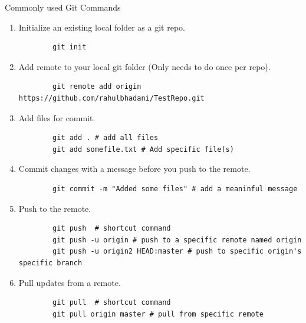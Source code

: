 \documentclass[aspectratio=169,xcolor=dvipsnames,svgnames,x11names,fleqn]{beamer}
\begin{document}
\begin{frame}{Commonly used Git Commands}

    \footnotesize

    \begin{enumerate}
        \item Initialize an existing local folder as a git repo.
        \begin{verbatim}
        git init
        \end{verbatim}
        \item Add remote to your local git folder (Only needs to do once per repo).
        \begin{verbatim}
        git remote add origin https://github.com/rahulbhadani/TestRepo.git
        \end{verbatim}
        \item Add files for commit.
        \begin{verbatim}
        git add . # add all files
        git add somefile.txt # Add specific file(s)
        \end{verbatim}
        \item Commit changes with a message before you push to the remote.
        \begin{verbatim}
        git commit -m "Added some files" # add a meaninful message
        \end{verbatim}
        \item Push to the remote.
        \begin{verbatim}
        git push  # shortcut command
        git push -u origin # push to a specific remote named origin
        git push -u origin2 HEAD:master # push to specific origin's specific branch
        \end{verbatim}
        \item Pull updates from a remote.
        \begin{verbatim}
        git pull  # shortcut command
        git pull origin master # pull from specific remote
        \end{verbatim}


\end{enumerate}
\end{frame}
\end{document}
